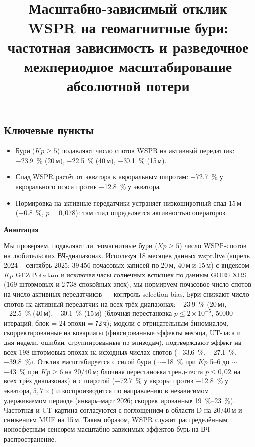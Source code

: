 \documentclass{agujournal2019}
\renewenvironment{keypoints}{%
  \subsection*{Ключевые пункты}%
  \begin{itemize}
}{%
  \end{itemize}
}
\renewenvironment{abstract}{%
  \begin{center}
  {\bfseries\large Аннотация}
  \end{center}
  \vspace{-0.5em}
  \small
}{%
  \normalsize
}
\begin{document}
\title{Масштабно-зависимый отклик WSPR на геомагнитные бури: \\
	частотная зависимость и разведочное межпериодное масштабирование абсолютной потери}



\linenumbers
\maketitle
\begin{keypoints}
	\item Бури ($Kp \ge 5$) подавляют число спотов WSPR на активный
	передатчик: \SI{-23,9}{\percent} (20\,м), \SI{-22,5}{\percent} (40\,м),
	\SI{-30,1}{\percent} (15\,м).
	\item Спад WSPR растёт от экватора к авроральным широтам:
	\SI{-72,7}{\percent} у аврорального пояса против \SI{-12,8}{\percent} у
	экватора.
	\item Нормировка на активные передатчики устраняет низкоширотный спад
	15\,м (\SI{-0,8}{\percent}, $p = 0{,}078$): там спад определяется
	активностью операторов.
\end{keypoints}

\begin{abstract}
	Мы проверяем, подавляют ли геомагнитные бури ($Kp \ge 5$) число WSPR-спотов
	на любительских ВЧ-диапазонах. Используя 18 месяцев данных wspr.live (апрель
	2024 -- сентябрь 2025; 39\,456 почасовых записей по 20\,м, 40\,м и 15\,м) с
	индексом $Kp$ GFZ Potsdam и исключая часы солнечных вспышек по данным GOES
	XRS (169 штормовых и 2\,738 спокойных эпох), мы нормируем почасовое число
	спотов на число активных передатчиков --- контроль selection bias. Бури
	снижают число спотов на активный передатчик на всех трёх диапазонах:
	\SI{-23,9}{\percent} (20\,м), \SI{-22,5}{\percent} (40\,м),
	\SI{-30,1}{\percent} (15\,м) (блочная перестановка $p \le 2 \times
	10^{-5}$, \num{50000} итераций, блок = 24 эпохи = 72\,ч); модели с
	отрицательным биномиалом, скорректированные на ковариаты (фиксированные
	эффекты месяца, UT-часа и дня недели, ошибки, сгруппированные по эпизодам),
	подтверждают эффект на всех 198 штормовых эпохах на исходных числах
	спотов (\SI{-33,6}{\percent}, \SI{-27,1}{\percent},
	\SI{-39,8}{\percent}). Отклик масштабируется с силой
	бури ($\sim$\SI{-18}{\percent} при $Kp$ 5--6 до $\sim$\SI{-43}{\percent}
	при $Kp \ge 6$ на 20/40\,м; блочная перестановка тренд-теста $p \le 0{,}02$
	на всех трёх диапазонах) и с широтой (\SI{-72,7}{\percent} у авроры против
	\SI{-12,8}{\percent} у экватора, $5{,}7\times$) и воспроизводится по
	направлению в независимом удерживаемом периоде (январь--март 2026;
	скорректированные \SIrange{19}{23}{\percent}). Частотная и UT-картина
	согласуются с поглощением в области D на 20/40\,м и снижением MUF на
	15\,м. Таким образом, WSPR служит распределённым ионосферным сенсором
	масштабно-зависимых эффектов бурь на ВЧ-распространение.
\end{abstract}
\end{document}
